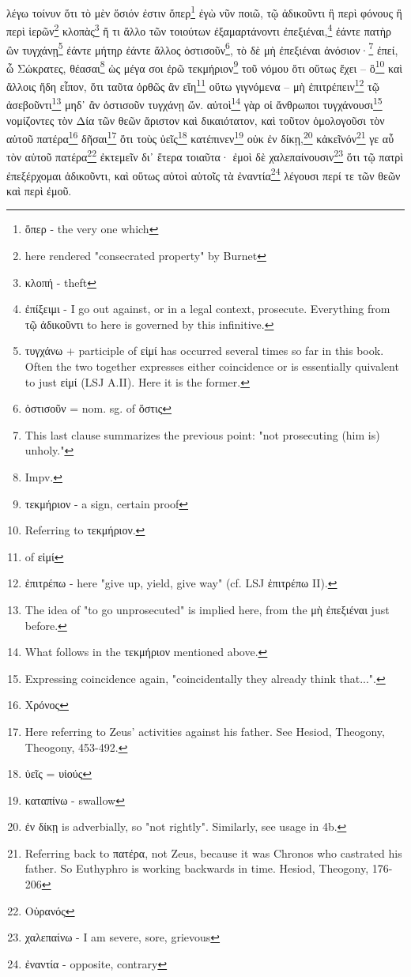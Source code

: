 λέγω
τοίνυν
ὅτι
τὸ
μὲν
ὅσιόν
ἐστιν
ὅπερ\footnote{ὅπερ - the very one which}
ἐγὼ
νῦν
ποιῶ,
τῷ
ἀδικοῦντι
ἢ
περὶ
φόνους
ἢ
περὶ
ἱερῶν\footnote{here rendered "consecrated property" by Burnet}
κλοπὰς\footnote{κλοπή - theft}
ἤ
τι
ἄλλο
τῶν
τοιούτων
ἐξαμαρτάνοντι
ἐπεξιέναι,\footnote{ἐπίξειμι - I go out against, or in a legal context, prosecute. Everything from τῷ ἀδικοῦντι to here is governed by this infinitive.}
ἐάντε
πατὴρ
\versification{[5e]}
ὢν
τυγχάνῃ\footnote{τυγχάνω + participle of εἰμί has occurred several times so far in this book. Often the two together expresses either coincidence or is essentially quivalent to just εἰμί (LSJ A.II). Here it is the former.}
ἐάντε
μήτηρ
ἐάντε
ἄλλος
ὁστισοῦν\footnote{ὁστισοῦν = nom. sg. of ὅστις},
τὸ
δὲ
μὴ
ἐπεξιέναι
ἀνόσιον·\footnote{This last clause summarizes the previous point: "not prosecuting (him is) unholy."}
ἐπεί,
ὦ
Σώκρατες,
θέασαι\footnote{Impv.}
ὡς
μέγα
σοι
ἐρῶ
τεκμήριον\footnote{τεκμήριον - a sign, certain proof}
τοῦ
νόμου
ὅτι
οὕτως
ἔχει
--
ὃ\footnote{Referring to τεκμήριον.}
καὶ
ἄλλοις
ἤδη
εἶπον,
ὅτι
ταῦτα
ὀρθῶς
ἂν
εἴη\footnote{ of εἰμί}
οὕτω
γιγνόμενα
--
μὴ
ἐπιτρέπειν\footnote{ἐπιτρέπω - here "give up, yield, give way" (cf. LSJ ἐπιτρέπω II).}
τῷ
ἀσεβοῦντι\footnote{The idea of "to go unprosecuted" is implied here, from the μὴ ἐπεξιέναι just before.}
μηδ᾽
ἂν
ὁστισοῦν
τυγχάνῃ
ὤν.
αὐτοὶ\footnote{What follows in the τεκμήριον mentioned above.}
γὰρ
οἱ
ἄνθρωποι
τυγχάνουσι\footnote{Expressing coincidence again, "coincidentally they already think that...".}
νομίζοντες
τὸν
Δία
τῶν
θεῶν
ἄριστον
καὶ
δικαιότατον,
\versification{[6a]}
καὶ
τοῦτον
ὁμολογοῦσι
τὸν
αὑτοῦ
πατέρα\footnote{Χρόνος}
δῆσαι\footnote{Here referring to Zeus' activities against his father. See Hesiod, Theogony, Theogony, 453-492.}
ὅτι
τοὺς
ὑεῖς\footnote{ὑεῖς = υἱούς}
κατέπινεν\footnote{καταπίνω - swallow}
οὐκ
ἐν
δίκῃ,\footnote{ἐν δίκῃ is adverbially, so "not rightly". Similarly, see usage in 4b.}
κἀκεῖνόν\footnote{Referring back to πατέρα, not Zeus, because it was Chronos who castrated his father. So Euthyphro is working backwards in time. Hesiod, Theogony, 176-206}
γε
αὖ
τὸν
αὑτοῦ
πατέρα\footnote{Οὐρανός}
ἐκτεμεῖν
δι᾽
ἕτερα
τοιαῦτα·
ἐμοὶ
δὲ
χαλεπαίνουσιν\footnote{χαλεπαίνω - I am severe, sore, grievous}
ὅτι
τῷ
πατρὶ
ἐπεξέρχομαι
ἀδικοῦντι,
καὶ
οὕτως
αὐτοὶ
αὑτοῖς
τὰ
ἐναντία\footnote{ἐναντία - opposite, contrary}
λέγουσι
περί
τε
τῶν
θεῶν
καὶ
περὶ
ἐμοῦ.
